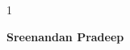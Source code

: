 \begin{spacing}{1}
		
	\end{spacing}
	\begin{flushright}
		\textbf{Sreenandan Pradeep}\\
	\end{flushright}